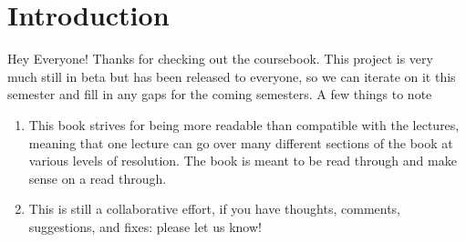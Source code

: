 \chapter{Introduction}

Hey Everyone! Thanks for checking out the coursebook. This project is very much still in beta but has been released to everyone, so we can iterate on it this semester and fill in any gaps for the coming semesters. A few things to note

\begin{enumerate}
	\item This book strives for being more readable than compatible with the lectures, meaning that one lecture can go over many different sections of the book at various levels of resolution. The book is meant to be read through and make sense on a read through.
	\item This is still a collaborative effort, if you have thoughts, comments, suggestions, and fixes: please let us know!
\end{enumerate}
